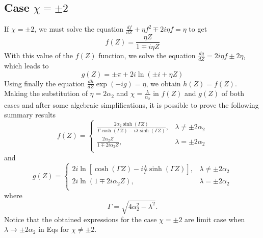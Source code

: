 \documentclass[12pt]{article}
\numberwithin{equation}{section}
\begin{document}
\subsection{Case $\chi=\pm 2$}
If $\chi=\pm 2$, we must solve the equation $\frac{df}{dZ}+ \eta f^2 \mp 2 i \eta f =\eta$ to get
\begin{equation} \label{ap06}
f(Z)=\frac{\eta Z}{1 \mp i\eta Z} 
\end{equation}
With this value of the $f(Z)$ function, we solve the equation $\frac{dg}{dZ}=2 i \eta f \pm 2\eta$, which leads to
\begin{equation} \label{ap07}
g(Z)=\pm \pi+2i\ln\left(\pm i + \eta Z\right) 
\end{equation}
Using finally the equation $\frac{dh}{dZ} \exp\left(-i g \right)=\eta$, we obtain $h(Z)=f(Z)$.\\
Making the substitution of $\eta=2\alpha_2$ and $\chi=\frac{\lambda}{\alpha_2}$ in $f(Z)$ and $g(Z)$ of both cases and after some algebraic simplifications, it is possible to prove the following summary results
\begin{equation} \label{ap08}
f(Z)=
\begin{cases}
\frac{2 \alpha_{2}\sinh\left(\Gamma Z\right)}{\Gamma \cosh\left(\Gamma Z\right) - i \lambda  \sinh\left(\Gamma Z\right)},
& \lambda \neq \pm 2 \alpha_2 \\
\frac{2\alpha_2 Z}{1 \mp 2i\alpha_2 Z}, & \lambda = \pm 2 \alpha_2 \\
\end{cases}
\end{equation}
and
\begin{equation} \label{ap09}
g(Z)=
\begin{cases}
2 i \ln \left[\cosh \left(\Gamma Z\right) -i \frac{\lambda}{\Gamma} \sinh \left(\Gamma Z\right) \right],
& \lambda \neq \pm 2 \alpha_2 \\
2i\ln\left(1 \mp 2i\alpha_2 Z\right) , & \lambda = \pm 2 \alpha_2 \\
\end{cases}
\end{equation}
where
\begin{equation} \label{ap10}
\Gamma=\sqrt{4\alpha_2^2-\lambda^2}.
\end{equation}
Notice that the obtained expressions for the case $\chi=\pm 2$ are limit case when $\lambda \rightarrow \pm 2 \alpha_2$ in Eqs for $\chi\neq \pm2$.
\end{document}
